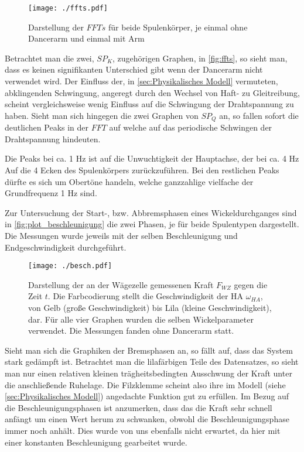 \begin{figure}[H]
    \centering
    \texttt{[image: ./ffts.pdf]}
    \caption{Darstellung der $FFTs$ für beide Spulenkörper, je einmal ohne Dancerarm und einmal mit Arm}
    \label{fig:ffts}
\end{figure}

Betrachtet man die zwei, $SP_K$, zugehörigen Graphen, in \autoref{fig:ffts}, so sieht man, dass es keinen signifikanten Unterschied gibt wenn der Dancerarm nicht verwendet wird.
Der Einfluss der, in \autoref{sec:Physikalisches Modell} vermuteten, abklingenden Schwingung, angeregt durch den Wechsel von Haft- zu Gleitreibung, scheint vergleichsweise wenig Einfluss auf die Schwingung der Drahtspannung zu haben.
Sieht man sich hingegen die zwei Graphen von $SP_Q$ an, so fallen sofort die deutlichen Peaks in der $FFT$ auf  welche auf das periodische Schwingen der Drahtspannung hindeuten.

Die Peaks bei ca. 1 Hz ist auf die Unwuchtigkeit der Hauptachse, der bei ca. 4 Hz Auf die 4 Ecken des Spulenkörpers zurückzuführen.
Bei den restlichen Peaks dürfte es sich um Obertöne handeln, welche ganzzahlige vielfache der Grundfrequenz 1 Hz sind.

Zur Untersuchung der Start-, bzw. Abbremsphasen eines Wickeldurchganges sind in \autoref{fig:plot_beschleunigung} die zwei Phasen, je für beide Spulentypen dargestellt. Die Messungen wurde jeweils mit der selben Beschleunigung und Endgeschwindigkeit durchgeführt.


\begin{figure}[H]
    \centering
    \texttt{[image: ./besch.pdf]}
    \caption{Darstellung der an der Wägezelle gemessenen Kraft $F_{WZ}$ gegen die Zeit $t$. Die Farbcodierung stellt die Geschwindigkeit der HA $\omega_{HA}$, von Gelb (große Geschwindigkeit) bis Lila (kleine Geschwindigkeit), dar. Für alle vier Graphen wurden die selben Wickelparameter verwendet. Die Messungen fanden ohne Dancerarm statt.}
    \label{fig:plot_beschleunigung}
\end{figure}

Sieht man sich die Graphiken der Bremsphasen an, so fällt auf, dass das System stark gedämpft ist. Betrachtet man die lilafärbigen Teile des Datensatzes, so sieht man nur einen relativen kleinen trägheitsbedingten Ausschwung der Kraft unter die anschließende Ruhelage. Die Filzklemme scheint also ihre im Modell (siehe \autoref{sec:Physikalisches Modell}) angedachte Funktion gut zu erfüllen. Im Bezug auf die Beschleunigungsphasen ist anzumerken, dass das die Kraft sehr schnell anfängt um einen Wert herum zu schwanken, obwohl die Beschleunigungsphase immer noch anhält. Dies wurde von uns ebenfalls nicht erwartet, da hier mit einer konstanten Beschleunigung gearbeitet wurde.  



